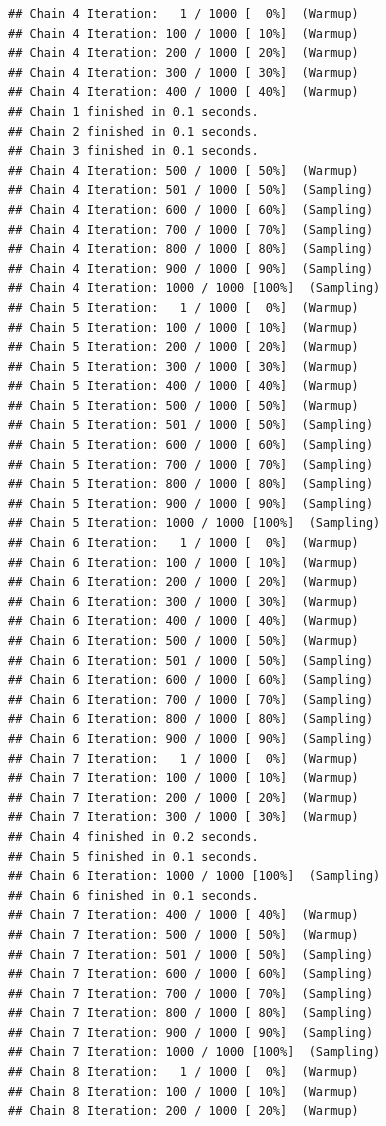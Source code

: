 \documentclass[
]{book}
\begin{document}
\begin{verbatim}
## Chain 4 Iteration:   1 / 1000 [  0%]  (Warmup) 
## Chain 4 Iteration: 100 / 1000 [ 10%]  (Warmup) 
## Chain 4 Iteration: 200 / 1000 [ 20%]  (Warmup) 
## Chain 4 Iteration: 300 / 1000 [ 30%]  (Warmup) 
## Chain 4 Iteration: 400 / 1000 [ 40%]  (Warmup) 
## Chain 1 finished in 0.1 seconds.
## Chain 2 finished in 0.1 seconds.
## Chain 3 finished in 0.1 seconds.
## Chain 4 Iteration: 500 / 1000 [ 50%]  (Warmup) 
## Chain 4 Iteration: 501 / 1000 [ 50%]  (Sampling) 
## Chain 4 Iteration: 600 / 1000 [ 60%]  (Sampling) 
## Chain 4 Iteration: 700 / 1000 [ 70%]  (Sampling) 
## Chain 4 Iteration: 800 / 1000 [ 80%]  (Sampling) 
## Chain 4 Iteration: 900 / 1000 [ 90%]  (Sampling) 
## Chain 4 Iteration: 1000 / 1000 [100%]  (Sampling) 
## Chain 5 Iteration:   1 / 1000 [  0%]  (Warmup) 
## Chain 5 Iteration: 100 / 1000 [ 10%]  (Warmup) 
## Chain 5 Iteration: 200 / 1000 [ 20%]  (Warmup) 
## Chain 5 Iteration: 300 / 1000 [ 30%]  (Warmup) 
## Chain 5 Iteration: 400 / 1000 [ 40%]  (Warmup) 
## Chain 5 Iteration: 500 / 1000 [ 50%]  (Warmup) 
## Chain 5 Iteration: 501 / 1000 [ 50%]  (Sampling) 
## Chain 5 Iteration: 600 / 1000 [ 60%]  (Sampling) 
## Chain 5 Iteration: 700 / 1000 [ 70%]  (Sampling) 
## Chain 5 Iteration: 800 / 1000 [ 80%]  (Sampling) 
## Chain 5 Iteration: 900 / 1000 [ 90%]  (Sampling) 
## Chain 5 Iteration: 1000 / 1000 [100%]  (Sampling) 
## Chain 6 Iteration:   1 / 1000 [  0%]  (Warmup) 
## Chain 6 Iteration: 100 / 1000 [ 10%]  (Warmup) 
## Chain 6 Iteration: 200 / 1000 [ 20%]  (Warmup) 
## Chain 6 Iteration: 300 / 1000 [ 30%]  (Warmup) 
## Chain 6 Iteration: 400 / 1000 [ 40%]  (Warmup) 
## Chain 6 Iteration: 500 / 1000 [ 50%]  (Warmup) 
## Chain 6 Iteration: 501 / 1000 [ 50%]  (Sampling) 
## Chain 6 Iteration: 600 / 1000 [ 60%]  (Sampling) 
## Chain 6 Iteration: 700 / 1000 [ 70%]  (Sampling) 
## Chain 6 Iteration: 800 / 1000 [ 80%]  (Sampling) 
## Chain 6 Iteration: 900 / 1000 [ 90%]  (Sampling) 
## Chain 7 Iteration:   1 / 1000 [  0%]  (Warmup) 
## Chain 7 Iteration: 100 / 1000 [ 10%]  (Warmup) 
## Chain 7 Iteration: 200 / 1000 [ 20%]  (Warmup) 
## Chain 7 Iteration: 300 / 1000 [ 30%]  (Warmup) 
## Chain 4 finished in 0.2 seconds.
## Chain 5 finished in 0.1 seconds.
## Chain 6 Iteration: 1000 / 1000 [100%]  (Sampling) 
## Chain 6 finished in 0.1 seconds.
## Chain 7 Iteration: 400 / 1000 [ 40%]  (Warmup) 
## Chain 7 Iteration: 500 / 1000 [ 50%]  (Warmup) 
## Chain 7 Iteration: 501 / 1000 [ 50%]  (Sampling) 
## Chain 7 Iteration: 600 / 1000 [ 60%]  (Sampling) 
## Chain 7 Iteration: 700 / 1000 [ 70%]  (Sampling) 
## Chain 7 Iteration: 800 / 1000 [ 80%]  (Sampling) 
## Chain 7 Iteration: 900 / 1000 [ 90%]  (Sampling) 
## Chain 7 Iteration: 1000 / 1000 [100%]  (Sampling) 
## Chain 8 Iteration:   1 / 1000 [  0%]  (Warmup) 
## Chain 8 Iteration: 100 / 1000 [ 10%]  (Warmup) 
## Chain 8 Iteration: 200 / 1000 [ 20%]  (Warmup)
\end{verbatim}
\end{document}
